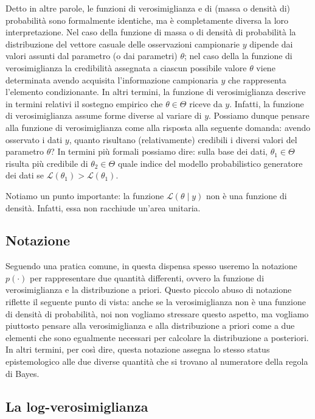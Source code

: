 \documentclass[
]{book}
\theoremstyle{definition}
\theoremstyle{definition}
\theoremstyle{definition}
\theoremstyle{definition}
\theoremstyle{remark}
\begin{document}
Detto in altre parole, le funzioni di verosimiglianza e di (massa o densità di) probabilità sono formalmente identiche, ma è completamente diversa la loro interpretazione. Nel caso della funzione di massa o di densità di probabilità la distribuzione del vettore casuale delle osservazioni campionarie \(y\) dipende dai valori assunti dal parametro (o dai parametri) \(\theta\); nel caso della la funzione di verosimiglianza la credibilità assegnata a ciascun possibile valore \(\theta\) viene determinata avendo acquisita l'informazione campionaria \(y\) che rappresenta l'elemento condizionante. In altri termini, la funzione di verosimiglianza descrive in termini relativi il sostegno empirico che \(\theta \in \Theta\) riceve da \(y\). Infatti, la funzione di verosimiglianza assume forme diverse al variare di \(y\). Possiamo dunque pensare alla funzione di verosimiglianza come alla risposta alla seguente domanda: avendo osservato i dati \(y\), quanto risultano (relativamente) credibili i diversi valori del parametro \(\theta\)? In termini più formali possiamo dire: sulla base dei dati, \(\theta_1 \in \Theta\) risulta più credibile di \(\theta_2 \in \Theta\) quale indice del modello probabilistico generatore dei dati se \(\mathcal{L}(\theta_1) > \mathcal{L}(\theta_1)\).

Notiamo un punto importante: la funzione \(\mathcal{L}(\theta \mid y)\) non è una funzione di densità. Infatti, essa non racchiude un'area unitaria.

\hypertarget{notazione-1}{%
\subsection{Notazione}\label{notazione-1}}

Seguendo una pratica comune, in questa dispensa spesso useremo la notazione \(p(\cdot)\) per rappresentare due quantità differenti, ovvero la funzione di verosimiglianza e la distribuzione a priori. Questo piccolo abuso di notazione riflette il seguente punto di vista: anche se la verosimiglianza non è una funzione di densità di probabilità, noi non vogliamo stressare questo aspetto, ma vogliamo piuttosto pensare alla verosimiglianza e alla distribuzione a priori come a due elementi che sono egualmente necessari per calcolare la distribuzione a posteriori. In altri termini, per così dire, questa notazione assegna lo stesso status epistemologico alle due diverse quantità che si trovano al numeratore della regola di Bayes.

\hypertarget{la-log-verosimiglianza}{%
\subsection{La log-verosimiglianza}\label{la-log-verosimiglianza}}
\end{document}
